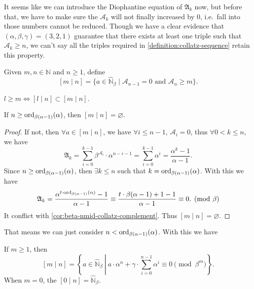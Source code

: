 It seems like we can introduce the Diophantine equation of $\mathfrak{A}_k$ now, but before that, we have to make sure the $\mathcal{A}_k$ will not finally increased by $0$, i.e.\ fall into those numbers cannot be reduced.
Though we have a clear evidence that $(\alpha, \beta, \gamma) = (3, 2, 1)$ guarantee that there exists at least one triple such that $\mathcal{A}_k \ge n$, we can't say all the triples required in \cref{definition:collatz-sequence} retain this property.
\begin{definition}\label{def:elements-reduce-m-val-by-n-step}
Given $m,n \in \mathbb{N}$ and $n \ge 1$, define
\[ [m\mid n] = \{a \in \widehat{\mathbb{N}}_{\beta} \mid \mathcal{A}_{n-1} = 0 \text{ and } \mathcal{A}_n \ge m \}. \]
\end{definition}
\begin{proposition}
    $ l \ge m \Longleftrightarrow [l\mid n] \subset [m\mid n]$.
\end{proposition}
\begin{proposition}
    If $n \ge \operatorname{ord}_{\beta(\alpha - 1)}(\alpha)$, then $[m\mid n] = \varnothing$.
\end{proposition}
\begin{proof}
    If not, then
    $\forall a\in [m \mid n]$, we have $\forall i \le n - 1$, $\mathcal{A}_i = 0$, thus $\forall 0 < k \le n$, we have
    \[ \mathfrak{A}_k = \sum_{i=0}^{k-1}\beta^{\mathcal{A}_i}\cdot\alpha^{n-i-1} = \sum_{i=0}^{k-1}\alpha^{i} = \frac{\alpha^{k} - 1}{\alpha - 1}. \]
    Since $n \ge \operatorname{ord}_{\beta(\alpha - 1)}(\alpha)$, then $\exists k \le n$ such that $k = \operatorname{ord}_{\beta(\alpha - 1)}(\alpha)$. With this we have
    \[ \mathfrak{A}_k = \frac{\alpha^{t \cdot \operatorname{ord}_{\beta(\alpha - 1)}(\alpha)} - 1}{\alpha - 1} \equiv \frac{t\cdot\beta(\alpha - 1) + 1 - 1}{\alpha - 1} \equiv 0. \pmod{\beta} \]
    It conflict with \cref{cor:beta-nmid-collatz-complement}. Thus $[m\mid n] = \varnothing$.
\end{proof}
That means we can just consider $n < \operatorname{ord}_{\beta(\alpha - 1)}(\alpha)$. With this we have
\begin{proposition}
If $m \ge 1$, then
\[ [m\mid n] = \left\{a \in \widehat{\mathbb{N}}_{\beta}\ \left|\  a\cdot\alpha^n + \gamma\cdot\sum_{i = 0}^{n-1}\alpha^i \equiv 0 \pmod{\beta^{m}}\right.\right\}. \]
When $m = 0$, the $[0\mid n] = \widehat{\mathbb{N}}_{\beta}$.
\end{proposition}
